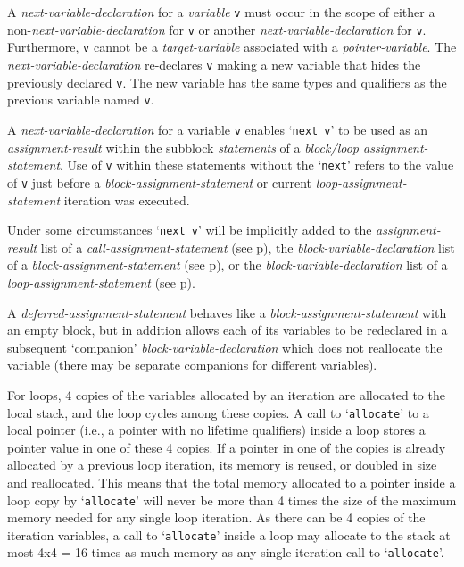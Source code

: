 \documentclass[12pt]{article}
\newcommand{\pagref}[1]{p\pageref{#1}}
\begin{document}
A {\em next-variable-declaration} for a {\em variable} {\tt v}
must occur in the scope of either a non-{\em next-variable-declaration}
for {\tt v} or another {\em next-variable-declaration} for {\tt v}.
Furthermore, {\tt v} cannot be a {\em target-variable} associated
with a {\em pointer-variable}.
The {\em next-variable-declaration} re-declares {\tt v} making a new
variable that hides the previously declared {\tt v}.  The new variable
has the same types and qualifiers as the previous variable named {\tt v}.

A {\em next-variable-declaration} for a variable {\tt v} enables
`{\tt next v}' to be used as an {\em assignment-result} within the subblock
{\em statements} of a {\em block/loop assignment-statement}.  Use of
{\tt v} within these statements without the `{\tt next}'
refers to the value of {\tt v} just
before a {\em block-assignment-statement} or current
{\em loop-assignment-statement} iteration was executed.

Under some circumstances `{\tt next v}' will
be implicitly added to the {\em assignment-result}
list of a {\em call-assignment-statement} (see \pagref{CALL-NEXT-PROMOTION}),
the {\em block-variable-declaration} list
of a {\em block-assignment-statement} (see \pagref{BLOCK-NEXT-PROMOTION}),
or the {\em block-variable-declaration} list of a
{\em loop-assignment-statement} (see \pagref{LOOP-NEXT-PROMOTION}).

A {\em deferred-assignment-statement}
behaves like a {\em block-assignment-statement} with an empty block,
but in addition allows each of its variables to be redeclared in a subsequent
`companion' {\em block-variable-declaration} which does not
reallocate the variable (there may be separate companions for different
variables).

For loops\label{LOOP-ALLOCATION},
4 copies of the variables allocated by an iteration
are allocated to the local stack,
and the loop cycles among these copies.
A call to `{\tt allocate}' to a local pointer (i.e., a pointer with no
lifetime qualifiers) inside a loop stores a pointer value in
one of these 4 copies.  If a pointer in one of the copies is already
allocated by a previous loop iteration, its memory is reused, or
doubled in size and reallocated.  This means that the total memory allocated
to a pointer inside a loop copy by `{\tt allocate}' will never be more than
4 times the size of the maximum memory needed for any single loop
iteration.  As there can be 4 copies of the iteration variables,
a call to `{\tt allocate}' inside a loop
may allocate to the stack at most 4x4 = 16 times as much
memory as any single iteration call to `{\tt allocate}'.
\end{document}
